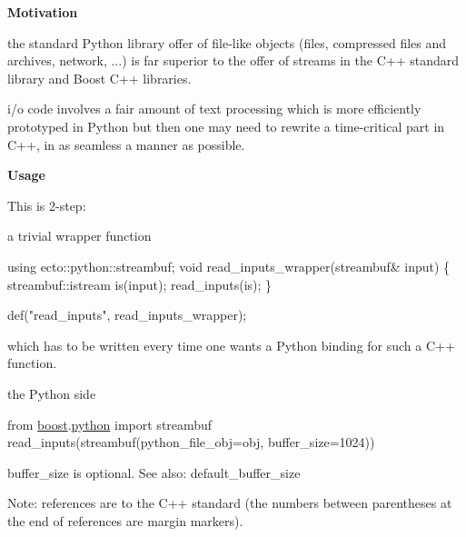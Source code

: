 {\bfseries Motivation} 


\begin{DoxyItemize}
\item the standard Python library offer of file-\/like objects (files, compressed files and archives, network, ...) is far superior to the offer of streams in the C++ standard library and Boost C++ libraries.
\item i/o code involves a fair amount of text processing which is more efficiently prototyped in Python but then one may need to rewrite a time-\/critical part in C++, in as seamless a manner as possible.
\end{DoxyItemize}

{\bfseries Usage} 

This is 2-\/step\+:


\begin{DoxyItemize}
\item a trivial wrapper function
\end{DoxyItemize}


\begin{DoxyCode}
\textcolor{keyword}{using} ecto::python::streambuf;
\textcolor{keywordtype}{void} read\_inputs\_wrapper(streambuf& input)
\{
  streambuf::istream is(input);
  read\_inputs(is);
\}

def(\textcolor{stringliteral}{"read\_inputs"}, read\_inputs\_wrapper);
\end{DoxyCode}


which has to be written every time one wants a Python binding for such a C++ function.


\begin{DoxyItemize}
\item the Python side
\end{DoxyItemize}


\begin{DoxyCode}
from \hyperlink{namespaceboost}{boost}.\hyperlink{namespaceboost_1_1python}{python} \textcolor{keyword}{import} streambuf
read\_inputs(streambuf(python\_file\_obj=obj, buffer\_size=1024))
\end{DoxyCode}


{\ttfamily buffer\+\_\+size} is optional. See also\+: {\ttfamily default\+\_\+buffer\+\_\+size} 

Note\+: references are to the C++ standard (the numbers between parentheses at the end of references are margin markers). \hypertarget{namespaceecto_1_1py_a9baa9f1e5394841101cbdc2eab37094c}{}
